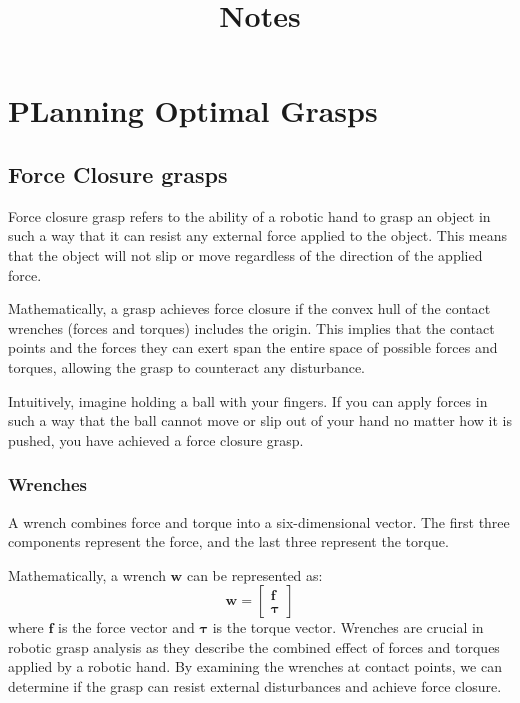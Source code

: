 \documentclass[12pt]{article}
\title{Notes}
\author{}
\date{}
\begin{document}
\maketitle

\section{PLanning Optimal Grasps}
\subsection{Force Closure grasps}

Force closure grasp refers to the ability of a robotic hand to grasp an object in such a way that it can resist any external force applied to the object. This means that the object will not slip or move regardless of the direction of the applied force.

Mathematically, a grasp achieves force closure if the convex hull of the contact wrenches (forces and torques) includes the origin. This implies that the contact points and the forces they can exert span the entire space of possible forces and torques, allowing the grasp to counteract any disturbance.

Intuitively, imagine holding a ball with your fingers. If you can apply forces in such a way that the ball cannot move or slip out of your hand no matter how it is pushed, you have achieved a force closure grasp.

\subsubsection{Wrenches}

A wrench combines force and torque into a six-dimensional vector. The first three components represent the force, and the last three represent the torque.

Mathematically, a wrench \( \mathbf{w} \) can be represented as:
\[
\mathbf{w} = \begin{bmatrix}
\mathbf{f} \\
\mathbf{\tau}
\end{bmatrix}
\]
where \( \mathbf{f} \) is the force vector and \( \mathbf{\tau} \) is the torque vector.
Wrenches are crucial in robotic grasp analysis as they describe the combined effect of forces and torques applied by a robotic hand. By examining the wrenches at contact points, we can determine if the grasp can resist external disturbances and achieve force closure.
\end{document}
